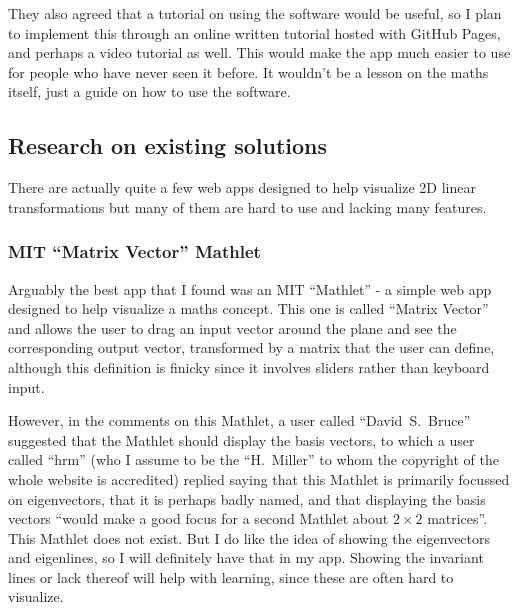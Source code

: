 \documentclass[../main.tex]{subfiles}
\begin{document}
They also agreed that a tutorial on using the software would be useful, so I plan to implement this through an online written tutorial hosted with GitHub Pages, and perhaps a video tutorial as well. This would make the app much easier to use for people who have never seen it before. It wouldn't be a lesson on the maths itself, just a guide on how to use the software.

\subsection{Research on existing solutions\label{analysis:research-on-existing-solutions}}

There are actually quite a few web apps designed to help visualize 2D linear transformations but many of them are hard to use and lacking many features.

\subsubsection{MIT \enquote{Matrix Vector} Mathlet\label{analysis:research-on-existing-solutions:mit-mathlet-matrix-vector}}

Arguably the best app that I found was an MIT \enquote{Mathlet} - a simple web app designed to help visualize a maths concept. This one is called \enquote{Matrix Vector}\cite{mit-mathlet-matrix-vector} and allows the user to drag an input vector around the plane and see the corresponding output vector, transformed by a matrix that the user can define, although this definition is finicky since it involves sliders rather than keyboard input.


However, in the comments on this Mathlet, a user called \enquote{David~S.~Bruce} suggested that the Mathlet should display the basis vectors, to which a user called \enquote{hrm} (who I assume to be the \enquote{H.~Miller} to whom the copyright of the whole website is accredited) replied saying that this Mathlet is primarily focussed on eigenvectors, that it is perhaps badly named, and that displaying the basis vectors \enquote{would make a good focus for a second Mathlet about $2 \times 2$ matrices}. This Mathlet does not exist. But I do like the idea of showing the eigenvectors and eigenlines, so I will definitely have that in my app. Showing the invariant lines or lack thereof will help with learning, since these are often hard to visualize.
\end{document}
